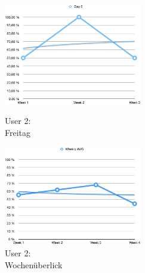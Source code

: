 \begin{figure}[t!]
    \centering
    \parbox{6cm}{
    \includegraphics[width=6cm]{./Abbildungen/Kapitel_04/usr2day5.png}
    \caption{User 2: \\Freitag}
    \label{img:usr2day5}}
    \qquad
    \begin{minipage}{6cm}
    \includegraphics[width=6cm]{./Abbildungen/Kapitel_04/usr2wa.png}
    \caption{User 2: \\Wochenüberlick}
    \label{img:usr2wa}
    \end{minipage}
\end{figure}
